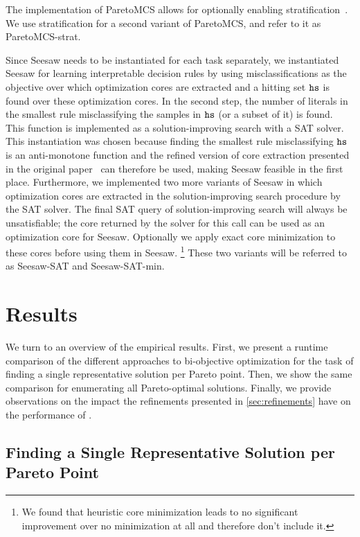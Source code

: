 The implementation of ParetoMCS allows for optionally enabling stratification~\autocite{DBLP:conf/ijcai/Terra-NevesLM18}.
We use stratification for a second variant of ParetoMCS, and refer to it as ParetoMCS-strat.

Since Seesaw needs to be instantiated for each task separately, we instantiated Seesaw for learning interpretable decision rules by using misclassifications as the objective over which optimization cores are extracted and a hitting set $\texttt{hs}$ is found over these optimization cores.
In the second step, the number of literals in the smallest rule misclassifying the samples in $\texttt{hs}$ (or a subset of it) is found.
This function is implemented as a solution-improving search with a SAT solver.
This instantiation was chosen because finding the smallest rule misclassifying $\texttt{hs}$ is an anti-monotone function and the refined version of core extraction presented in the original paper~\autocite{DBLP:conf/cp/JanotaMSM21} can therefore be used, making Seesaw feasible in the first place.
Furthermore, we implemented two more variants of Seesaw in which optimization cores are extracted in the solution-improving search procedure by the SAT solver.
The final SAT query of solution-improving search will always be unsatisfiable;
the core returned by the solver for this call can be used as an optimization core for Seesaw.
Optionally we apply exact core minimization to these cores before using them in Seesaw.%
\footnote{We found that heuristic core minimization leads to no significant improvement over no minimization at all and therefore don't include it.}
These two variants will be referred to as Seesaw-SAT and Seesaw-SAT-min.

\section{Results\label{sec:results}}

We turn to an overview of the empirical results.
First, we present a runtime comparison of the different approaches to bi-objective optimization for the task of finding a single representative solution per Pareto point.
Then, we show the same comparison for enumerating all Pareto-optimal solutions.
Finally, we provide observations on the impact the refinements presented in \cref{sec:refinements} have on the performance of \algname{}.

\subsection{Finding a Single Representative Solution per Pareto Point}


